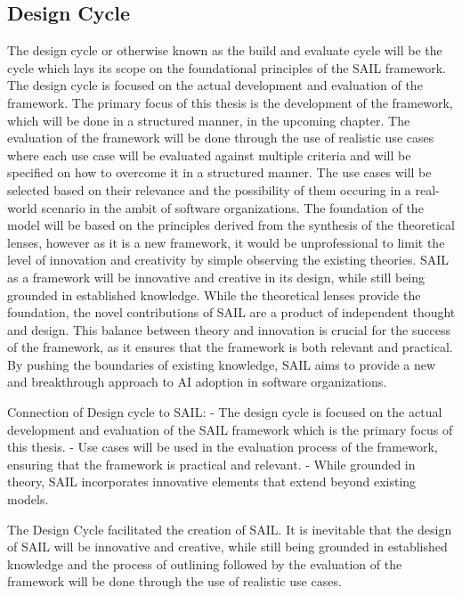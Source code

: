 \documentclass[]{imc-inf}
\begin{document}
\subsection{Design Cycle}\label{design-cycle}

The design cycle or otherwise known as the build and evaluate cycle will
be the cycle which lays its scope on the foundational principles of the
SAIL framework. The design cycle is focused on the actual development
and evaluation of the framework. The primary focus of this thesis is the
development of the framework, which will be done in a structured manner,
in the upcoming chapter. The evaluation of the framework will be done
through the use of realistic use cases where each use case will be
evaluated against multiple criteria and will be specified on how to
overcome it in a structured manner. The use cases will be selected based
on their relevance and the possibility of them occuring in a real-world
scenario in the ambit of software organizations. The foundation of the
model will be based on the principles derived from the synthesis of the
theoretical lenses, however as it is a new framework, it would be
unprofessional to limit the level of innovation and creativity by simple
observing the existing theories. SAIL as a framework will be innovative
and creative in its design, while still being grounded in established
knowledge. While the theoretical lenses provide the foundation, the
novel contributions of SAIL are a product of independent thought and
design. This balance between theory and innovation is crucial for the
success of the framework, as it ensures that the framework is both
relevant and practical. By pushing the boundaries of existing knowledge,
SAIL aims to provide a new and breakthrough approach to AI adoption in
software organizations.

Connection of Design cycle to SAIL: - The design cycle is focused on the
actual development and evaluation of the SAIL framework which is the
primary focus of this thesis. - Use cases will be used in the evaluation
process of the framework, ensuring that the framework is practical and
relevant. - While grounded in theory, SAIL incorporates innovative
elements that extend beyond existing models.

The Design Cycle facilitated the creation of SAIL. It is inevitable that
the design of SAIL will be innovative and creative, while still being
grounded in established knowledge and the process of outlining followed
by the evaluation of the framework will be done through the use of
realistic use cases.
\end{document}
